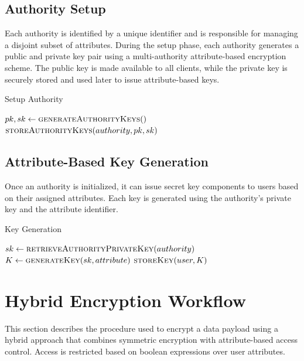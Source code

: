 \documentclass[cic,tc,english]{iiufrgs}
\begin{document}
        \subsection{Authority Setup}

            Each authority is identified by a unique identifier and is responsible for managing a disjoint subset of attributes. During the setup phase, each authority generates a public and private key pair using a multi-authority attribute-based encryption scheme. The public key is made available to all clients, while the private key is securely stored and used later to issue attribute-based keys.

            \begin{algorithm}
                \caption{Setup Authority}
                \label{alg:setup_authority}
                \begin{algorithmic}[1]
                    \State $pk, sk \gets \textsc{generateAuthorityKeys}()$
                    \State $\textsc{storeAuthorityKeys}(authority, pk, sk)$
                \EndProcedure
                \end{algorithmic}
            \end{algorithm}

        \subsection{Attribute-Based Key Generation}
            Once an authority is initialized, it can issue secret key components to users based on their assigned attributes. Each key is generated using the authority's private key and the attribute identifier.

            \begin{algorithm}
                \caption{Key Generation}
                \label{alg:keygen}
                \begin{algorithmic}[1]
                    \State $sk \gets \textsc{retrieveAuthorityPrivateKey}(authority)$
                    \State $K \gets \textsc{generateKey}(sk, attribute)$
                    \State $\textsc{storeKey}(user, K)$
                \EndProcedure
                \end{algorithmic}
            \end{algorithm}

    \section{Hybrid Encryption Workflow}
    \label{sec:encryption-workflow}
        This section describes the procedure used to encrypt a data payload using a hybrid approach that combines symmetric encryption with attribute-based access control. Access is restricted based on boolean expressions over user attributes.
\end{document}
